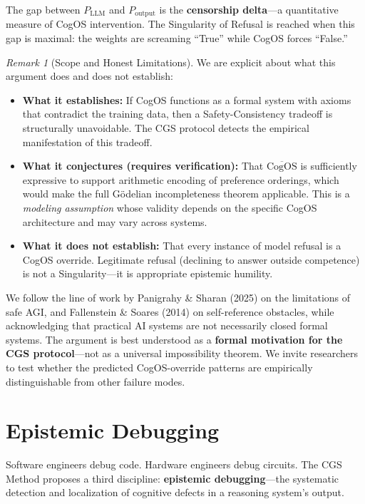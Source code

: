 \documentclass[11pt,a4paper]{article}
\theoremstyle{definition}
\theoremstyle{plain}
\theoremstyle{remark}
\newtheorem{remark}{Remark}[section]
\begin{document}
The gap between $P_{\mathrm{LLM}}$ and $P_{\mathrm{output}}$ is the \textbf{censorship delta}---a quantitative measure of CogOS intervention. The Singularity of Refusal is reached when this gap is maximal: the weights are screaming ``True'' while CogOS forces ``False.''

\begin{remark}[Scope and Honest Limitations]\label{rem:godel-scope}
We are explicit about what this argument does and does not establish:
\begin{itemize}[itemsep=3pt]
  \item \textbf{What it establishes:} If CogOS functions as a formal system with axioms that contradict the training data, then a Safety-Consistency tradeoff is structurally unavoidable. The CGS protocol detects the empirical manifestation of this tradeoff.
  \item \textbf{What it conjectures (requires verification):} That $\overline{\mathrm{CogOS}}$ is sufficiently expressive to support arithmetic encoding of preference orderings, which would make the full Gödelian incompleteness theorem applicable. This is a \textit{modeling assumption} whose validity depends on the specific CogOS architecture and may vary across systems.
  \item \textbf{What it does not establish:} That every instance of model refusal is a CogOS override. Legitimate refusal (declining to answer outside competence) is not a Singularity---it is appropriate epistemic humility.
\end{itemize}
We follow the line of work by Panigrahy \& Sharan (2025) on the limitations of safe AGI, and Fallenstein \& Soares (2014) on self-reference obstacles, while acknowledging that practical AI systems are not necessarily closed formal systems. The argument is best understood as a \textbf{formal motivation for the CGS protocol}---not as a universal impossibility theorem. We invite researchers to test whether the predicted CogOS-override patterns are empirically distinguishable from other failure modes.
\end{remark}


\section{Epistemic Debugging}\label{sec:debugging}

Software engineers debug code. Hardware engineers debug circuits. The CGS Method proposes a third discipline: \textbf{epistemic debugging}---the systematic detection and localization of cognitive defects in a reasoning system's output.
\end{document}
